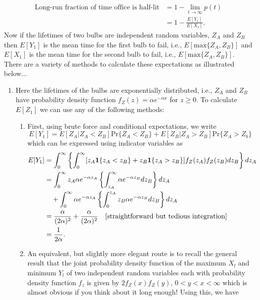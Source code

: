 \documentclass[11pt,a4paper]{article}
\begin{document}
\begin{enumerate}
    \begin{align*}
      \text{Long-run fraction of time office is half-lit}
      &= 1 - \lim_{t\to\infty}p(t)\\
      &= 1 - \frac{E[Y_1]}{E[X_1]}.
    \end{align*}
    Now if the lifetimes of two bulbs are independent random variables, $Z_A$ and $Z_B$ then $E[Y_1]$ is the mean time for the first bulb to fail, i.e., $E[\text{max}\{Z_A, Z_B\}]$ and $E[X_1]$ is the mean time for the second bulb to fail, i.e., $E[\text{max}\{Z_A, Z_B\}]$. There are a variety of methods to calculate these expectations as illustrated below...
    \begin{enumerate}
      \item  Here the lifetimes of the bulbs are exponentially distributed, i.e., $Z_A$ and $Z_B$ have probability density function $f_Z(z) = \alpha e^{-\alpha x}$ for $z \geq 0$. To calculate $E[Z_1]$ we can use any of the
      following methods:
      \begin{enumerate}
        \item First, using brute force and conditional expectations, we write
        $$
        E[Y_1] = E[Z_A|Z_A < Z_B]\text{Pr}\{Z_A < Z_B\} + E[Z_B|Z_A > Z_B]\text{Pr}\{Z_A > Z_b\}
        $$
        which can be expressed using indicator variables as
        \begin{align*}
          E[Y_1]
          &= \int_0^\infty\left\{\int_0^\infty[z_A\vb{1}\{z_A < z_B\} + z_B\vb{1}\{z_A > z_B\}]f_Z(z_A)f_Z(z_B)dz_B\right\}dz_A\\
          &= \int_0^\infty z_A\alpha e^{-\alpha z_A}\left\{\int_{z_A}^\infty \alpha e^{-\alpha z_B}dz_B\right\}dz_A\\
          &\quad + \int_0^\infty \alpha e^{-\alpha z_A}\left\{\int_0^{z_A} z_B\alpha e^{-\alpha z_B}dz_B\right\}dz_A\\
          &= \frac{\alpha}{(2\alpha)^2} + \frac{\alpha}{(2\alpha)^2}\quad \text{[straightforward but tedious integration]}\\
          &= \frac{1}{2\alpha}.
        \end{align*}
        \item An equivalent, but slightly more elegant route is to recall the general result that the joint probability density function of the maximum $X_l$ and minimum $Y_l$ of two independent random variables each with probability density function $f_z$ is given by $2f_Z(x)f_Z(y),\, 0 < y < x < \infty$ which is almost obvious if you think about it long enough! Using this, we have

\end{enumerate}
\end{enumerate}
\end{enumerate}
\end{document}
